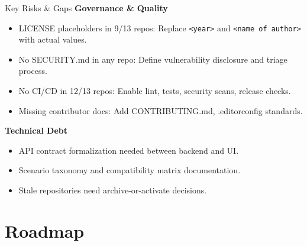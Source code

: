 \documentclass[aspectratio=169]{beamer}
\begin{document}
\begin{frame}{Key Risks \& Gaps \; \faExclamationTriangle}
  \textbf{Governance \& Quality}
  \begin{itemize}
    \item \alert{LICENSE placeholders in 9/13 repos}: Replace \texttt{<year>} and \texttt{<name of author>} with actual values.
    \item \alert{No SECURITY.md in any repo}: Define vulnerability disclosure and triage process.
    \item \alert{No CI/CD in 12/13 repos}: Enable lint, tests, security scans, release checks.
    \item \alert{Missing contributor docs}: Add CONTRIBUTING.md, .editorconfig standards.
  \end{itemize}
  \vspace{2mm}
  \textbf{Technical Debt}
  \begin{itemize}
    \item API contract formalization needed between backend and UI.
    \item Scenario taxonomy and compatibility matrix documentation.
    \item Stale repositories need archive-or-activate decisions.
  \end{itemize}
\end{frame}

\section{Roadmap}
\end{document}
